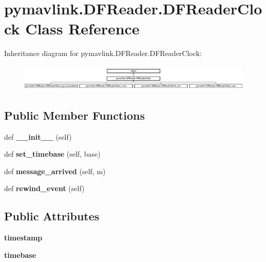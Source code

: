 \hypertarget{classpymavlink_1_1DFReader_1_1DFReaderClock}{}\section{pymavlink.\+D\+F\+Reader.\+D\+F\+Reader\+Clock Class Reference}
\label{classpymavlink_1_1DFReader_1_1DFReaderClock}
Inheritance diagram for pymavlink.\+D\+F\+Reader.\+D\+F\+Reader\+Clock\+:\begin{figure}[H]
\begin{center}
\leavevmode
\includegraphics[height=1.265060cm]{classpymavlink_1_1DFReader_1_1DFReaderClock}
\end{center}
\end{figure}
\subsection*{Public Member Functions}
\begin{DoxyCompactItemize}
\item 
\mbox{\label{classpymavlink_1_1DFReader_1_1DFReaderClock_a99d4363951b5ef9866cbd021ca4dd80f}} 
def {\bfseries \+\_\+\+\_\+init\+\_\+\+\_\+} (self)
\item 
\mbox{\label{classpymavlink_1_1DFReader_1_1DFReaderClock_a1f73678a08c32835bec25551701527e4}} 
def {\bfseries set\+\_\+timebase} (self, base)
\item 
\mbox{\label{classpymavlink_1_1DFReader_1_1DFReaderClock_a49037f269d69afa423bc7c4a5e1983ba}} 
def {\bfseries message\+\_\+arrived} (self, m)
\item 
\mbox{\label{classpymavlink_1_1DFReader_1_1DFReaderClock_a8216097142372761ae67e0ffd8ab5e69}} 
def {\bfseries rewind\+\_\+event} (self)
\end{DoxyCompactItemize}
\subsection*{Public Attributes}
\begin{DoxyCompactItemize}
\item 
\mbox{\label{classpymavlink_1_1DFReader_1_1DFReaderClock_abb110022a8a9204b253bd884ac9a5e13}} 
{\bfseries timestamp}
\item 
\mbox{\label{classpymavlink_1_1DFReader_1_1DFReaderClock_a883d452615664051a5dd91788a21ee03}} 
{\bfseries timebase}
\end{DoxyCompactItemize}


